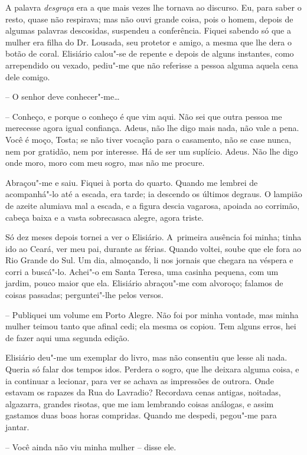 A palavra \emph{desgraça} era a que mais vezes lhe tornava ao discurso.
Eu, para saber o resto, quase não respirava; mas não ouvi grande coisa,
pois o homem, depois de algumas palavras descosidas, suspendeu a
conferência. Fiquei sabendo só que a mulher era filha do Dr. Lousada,
seu protetor e amigo, a mesma que lhe dera o botão de coral. Elisiário
calou"-se de repente e depois de alguns instantes, como arrependido ou
vexado, pediu"-me que não referisse a pessoa alguma aquela cena dele
comigo.

-- O senhor deve conhecer"-me\ldots{}

-- Conheço, e porque o conheço é que vim aqui. Não sei que outra pessoa
me merecesse agora igual confiança. Adeus, não lhe digo mais nada, não
vale a pena. Você é moço, Tosta; se não tiver vocação para o casamento,
não se case nunca, nem por gratidão, nem por interesse. Há de ser um
suplício. Adeus. Não lhe digo onde moro, moro com meu sogro, mas não me
procure.

Abraçou"-me e saiu. Fiquei à porta do quarto. Quando me lembrei de
acompanhá"-lo até a escada, era tarde; ia descendo os últimos degraus. O
lampião de azeite alumiava mal a escada, e a figura descia vagarosa,
apoiada ao corrimão, cabeça baixa e a vasta sobrecasaca alegre, agora
triste.

Só dez meses depois tornei a ver o Elisiário. A~primeira ausência foi
minha; tinha ido ao Ceará, ver meu pai, durante as férias. Quando
voltei, soube que ele fora ao Rio Grande do Sul. Um dia, almoçando, li
nos jornais que chegara na véspera e corri a buscá"-lo. Achei"-o em Santa
Teresa, uma casinha pequena, com um jardim, pouco maior que ela.
Elisiário abraçou"-me com alvoroço; falamos de coisas passadas;
perguntei"-lhe pelos versos.

-- Publiquei um volume em Porto Alegre. Não foi por minha vontade, mas
minha mulher teimou tanto que afinal cedi; ela mesma os copiou. Tem
alguns erros, hei de fazer aqui uma segunda edição.

Elisiário deu"-me um exemplar do livro, mas não consentiu que lesse ali
nada. Queria só falar dos tempos idos. Perdera o sogro, que lhe deixara
alguma coisa, e ia continuar a lecionar, para ver se achava as
impressões de outrora. Onde estavam os rapazes da Rua do Lavradio?
Recordava cenas antigas, noitadas, algazarra, grandes risotas, que me
iam lembrando coisas análogas, e assim gastamos duas boas horas
compridas. Quando me despedi, pegou"-me para jantar.

-- Você ainda não viu minha mulher -- disse ele. 

